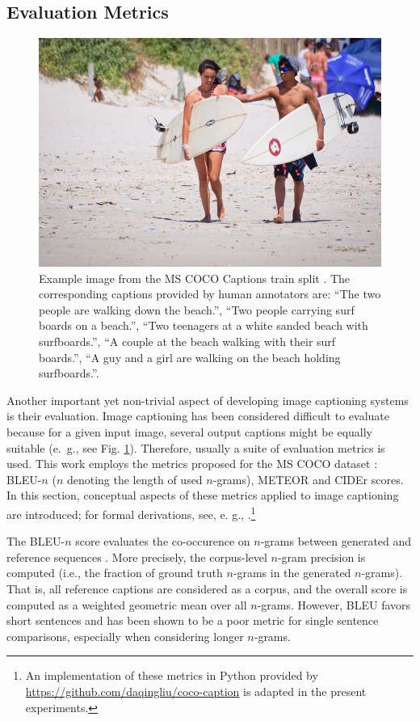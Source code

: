 \subsection{Evaluation Metrics}
\label{image_cap_metrics}

\begin{figure}
	\centering
	\includegraphics[width=0.7\linewidth]{images/COCO_train2014_example.jpg}
	\caption{Example image from the MS COCO Captions train split \parencite{chen2015microsoft}. The corresponding captions provided by human annotators are: ``The two people are walking down the beach.'', ``Two people carrying surf boards on a beach.'', ``Two teenagers at a white sanded beach with surfboards.'', ``A couple at the beach walking with their surf boards.'', ``A guy and a girl are walking on the beach holding surfboards.''. }
	\label{fig:coco_example}
\end{figure}

Another important yet non-trivial aspect of developing image captioning systems is their evaluation. Image captioning has been considered difficult to evaluate because for a given input image, several output captions might be equally suitable (e.~g., see Fig. \ref{fig:coco_example}). Therefore, usually a suite of evaluation metrics is used. This work employs the metrics proposed for the MS COCO dataset \parencite{chen2015microsoft}: BLEU-$n$ ($n$ denoting the length of used $n$-grams), METEOR and CIDEr scores. In this section, conceptual aspects of these metrics applied to image captioning are introduced; for formal derivations, see, e. g., \cite{chen2015microsoft}.\footnote{An implementation of these metrics in Python provided by \url{https://github.com/daqingliu/coco-caption} is adapted in the present experiments.}

The BLEU-$n$ score evaluates the co-occurence on $n$-grams between generated and reference sequences \parencite{papineni2002bleu}. More precisely, the corpus-level $n$-gram precision is computed (i.e., the fraction of ground truth $n$-grams in the generated $n$-grams). That is, all reference captions are considered as a corpus, and the overall score is computed as a weighted geometric mean over all $n$-grams. However, BLEU favors short sentences and has been shown to be a poor metric for single sentence comparisons, especially when considering longer $n$-grams.

